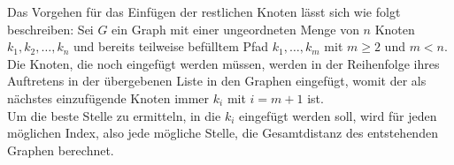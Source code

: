 
Das Vorgehen für das Einfügen der restlichen Knoten lässt sich wie folgt beschreiben: 
Sei $G$ ein Graph mit einer ungeordneten Menge von $n$ Knoten  $k_1,k_2,\ldots,k_n$ und bereits teilweise befülltem Pfad $k_1,\ldots,k_m$ mit $m \geq 2$ und $m < n$.
Die Knoten, die noch eingefügt werden müssen, werden in der Reihenfolge ihres Auftretens in der übergebenen Liste in den Graphen eingefügt, womit der als nächstes einzufügende Knoten immer $k_{i}$ mit $i = m + 1$ ist.
\\
Um die beste Stelle zu ermitteln, in die $k_i$ eingefügt werden soll, wird für jeden möglichen Index, also jede mögliche Stelle, die Gesamtdistanz des entstehenden Graphen berechnet. 

